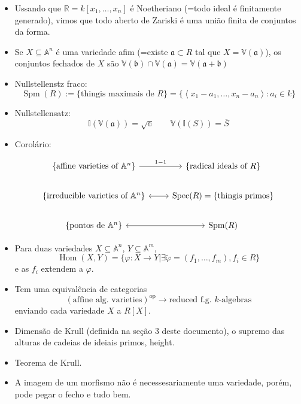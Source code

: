 \begin{itemize}
	\item Ussando que $\mathbb{R}=k[x_1,\ldots,x_n]$ \'e Noetheriano (=todo ideal \'e finitamente generado), vimos que todo aberto de Zariski \'e uma uni\~ao finita de conjuntos da forma.

	\item Se $X\subseteq \mathbb{A}^{n} $ \'e uma variedade afim (=existe $\mathfrak{a}\subset R$ tal que $X=\mathbb{V}(\mathfrak{a})$), os conjuntos fechados de $X$ s\~ao $\mathbb{V}(\mathfrak{b})\cap \mathbb{V}(\mathfrak{a})=\mathbb{V}(\mathfrak{a}+\mathfrak{b})$
	
	\item Nullstellenstz fraco:
		\[\operatorname{Spm }(R):=\{\text{thingis maximais de $R$} \} =\{\left<x_1-a_1,\ldots,x_n-a_n\right> :a_i\in k\}\]

	\item Nullstellensatz:
		\[\mathbb{I}(\mathbb{V}(\mathfrak{a}))=\sqrt{\mathbb{a}} \qquad \mathbb{V}(\mathbb{I}(S))=\overline{S}\]

	\item Corol\'ario:

		\[\begin{tikzcd}
			\{\text{affine varieties of $\mathbb{A}^{n} $} \} \arrow[r,"1-1"]&\{\text{radical ideals of $R$} \} \\
			\{\text{irreducible varieties of $\mathbb{A}^{n} $} \}\arrow[r]&\arrow[l]\operatorname{Spec}(R)=\{\text{thingis primos} \} \\
			\{\text{pontos de $\mathbb{A}^{n} $} \} \arrow[r]&\arrow[l]\operatorname{Spm}(R)
		\end{tikzcd}\]
	
	\item Para duas variedades $X\subseteq \mathbb{A}^n$, $Y\subseteq \mathbb{A}^m$,
		\[\operatorname{Hom}(X,Y)=\{\varphi:X\to Y|\exists \tilde{\varphi}=(f_1,\ldots,f_m), f_i\in R \}\]
		e as $f_i$ extendem a $\varphi$.

		 \item Tem uma equival\^encia de categorias
			 \[(\text{affine alg. varieties})^{\operatorname{op}}\to \text{reduced f.g. $k$-algebras}  \]
			 enviando cada variedade $X$ a $R[X]$.

	\item Dimens\~ao de Krull (definida na seç\~ao 3 deste documento), o supremo das alturas de cadeias de ideiais primos, height.

	\item Teorema de Krull.

	\item A imagem de um morfismo n\~ao \'e necessesariamente uma variedade, por\'em, pode pegar o fecho e tudo bem.

	
\end{itemize}

